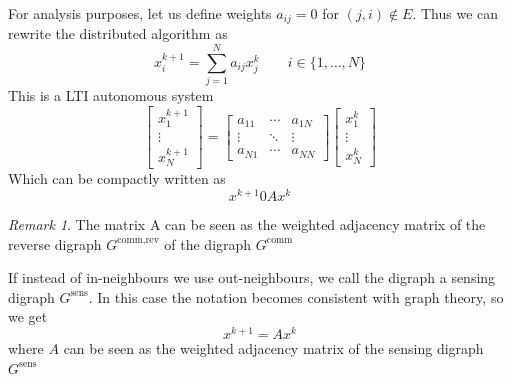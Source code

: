 \documentclass{book}
\theoremstyle{theoremv2}
\theoremstyle{defv2}
\theoremstyle{remark}
\newtheorem*{remark}{Remark}
\theoremstyle{remark}
\theoremstyle{definition}
\theoremstyle{definition}
\begin{document}
For analysis purposes, let us define weights $a_{ij}=0$ for $(j,i)\notin E$. Thus we can rewrite the distributed algorithm as 
\[
    x_i^{k+1}=\displaystyle\sum_{j=1}^{N}a_{ij}x_j^k \qquad i\in\{1,\dots,N\}
\]
This is a LTI autonomous system 
\[
    \begin{bmatrix}
        x_1^{k+1}\\ \vdots \\ x_N^{k+1}
    \end{bmatrix} = \begin{bmatrix}
        a_{11} & \cdots & a_{1N} \\ 
        \vdots & \ddots & \vdots \\
        a_{N1} & \cdots & a_{NN}
    \end{bmatrix} \begin{bmatrix}
        x_1^k \\ \vdots \\ x_N^k
    \end{bmatrix}
\]
Which can be compactly written as  
\[
    x^{k+1} 0 Ax^k
\]
\begin{remark}
    The matrix A can be seen as the weighted adjacency matrix of the reverse digraph $G^{\text{comm,rev}}$ of the digraph $G^{\text{comm}}$
\end{remark}
If instead of in-neighbours we use out-neighbours, we call the digraph a sensing digraph $G^{\text{sens}}$. In this case the notation becomes consistent with graph theory, so we get 
\[
    x^{k+1} = A x^k
\]
where $A$ can be seen as the weighted adjacency matrix of the sensing digraph $G^{\text{sens}}$
\end{document}
